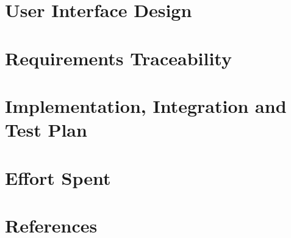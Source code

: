 \documentclass{Configuration_Files/PoliMi3i_thesis}
\begin{document}
    \chapter{User Interface Design}
    \label{ch:user_interface_design}%
    


    \chapter{Requirements Traceability}
    \label{ch:requirements_traceability}%
    


    \chapter{Implementation, Integration and Test Plan}


    \label{ch:implementation_integration_test_plan}%
    


    \chapter{Effort Spent}
    \label{ch:effort_spent}%
    

    \chapter{References}
    \label{ch:references}%
    

    \listoffigures

    \listoftables
    \cleardoublepage
\end{document}
